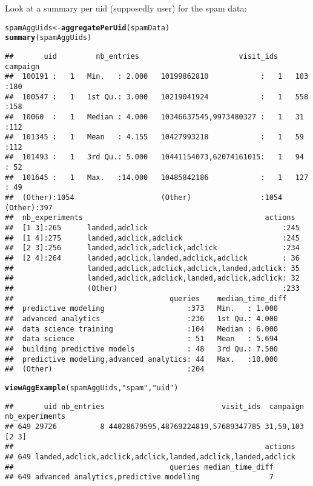 \documentclass{article}\usepackage[]{graphicx}\usepackage[]{color}
\makeatletter
\newcommand{\hlstr}[1]{\textcolor[rgb]{0.192,0.494,0.8}{#1}}%
\newcommand{\hlstd}[1]{\textcolor[rgb]{0.345,0.345,0.345}{#1}}%
\newcommand{\hlkwb}[1]{\textcolor[rgb]{0.69,0.353,0.396}{#1}}%
\newcommand{\hlkwd}[1]{\textcolor[rgb]{0.737,0.353,0.396}{\textbf{#1}}}%
\newenvironment{kframe}{%
 \def\at@end@of@kframe{}%
 \ifinner\ifhmode%
  \def\at@end@of@kframe{\end{minipage}}%
  \begin{minipage}{\columnwidth}%
 \fi\fi%
 \def\FrameCommand##1{\hskip\@totalleftmargin \hskip-\fboxsep
 \colorbox{shadecolor}{##1}\hskip-\fboxsep
     \hskip-\linewidth \hskip-\@totalleftmargin \hskip\columnwidth}%
 \MakeFramed {\advance\hsize-\width
   \@totalleftmargin\z@ \linewidth\hsize
   \@setminipage}}%
 {\par\unskip\endMakeFramed%
 \at@end@of@kframe}
\newenvironment{knitrout}{}{} %
\makeatother
\begin{document}
Look at a summary per uid (supposedly user) for the spam data:
\begin{knitrout}
\color{fgcolor}\begin{kframe}
\begin{alltt}
\hlstd{spamAggUids} \hlkwb{<-} \hlkwd{aggregatePerUid}\hlstd{(spamData)}
\hlkwd{summary}\hlstd{(spamAggUids)}
\end{alltt}
\begin{verbatim}
##       uid         nb_entries                       visit_ids       campaign  
##  100191 :   1   Min.   : 2.000   10199862810            :   1   103    :180  
##  100547 :   1   1st Qu.: 3.000   10219041924            :   1   558    :158  
##  10060  :   1   Median : 4.000   10346637545,9973480327 :   1   31     :112  
##  101345 :   1   Mean   : 4.155   10427993218            :   1   59     :112  
##  101493 :   1   3rd Qu.: 5.000   10441154073,62074161015:   1   94     : 52  
##  101645 :   1   Max.   :14.000   10485842186            :   1   127    : 49  
##  (Other):1054                    (Other)                :1054   (Other):397  
##  nb_experiments                                          actions   
##  [1 3]:265      landed,adclick                               :245  
##  [1 4]:275      landed,adclick,adclick                       :245  
##  [2 3]:256      landed,adclick,adclick,adclick               :234  
##  [2 4]:264      landed,adclick,landed,adclick,adclick        : 36  
##                 landed,adclick,adclick,adclick,landed,adclick: 35  
##                 landed,adclick,adclick,landed,adclick,adclick: 32  
##                 (Other)                                      :233  
##                                    queries    median_time_diff
##  predictive modeling                   :373   Min.   : 1.000  
##  advanced analytics                    :236   1st Qu.: 4.000  
##  data science training                 :104   Median : 6.000  
##  data science                          : 51   Mean   : 5.694  
##  building predictive models            : 48   3rd Qu.: 7.500  
##  predictive modeling,advanced analytics: 44   Max.   :10.000  
##  (Other)                               :204
\end{verbatim}
\begin{alltt}
\hlkwd{viewAggExample}\hlstd{(spamAggUids,} \hlstr{"spam"}\hlstd{,} \hlstr{"uid"}\hlstd{)}
\end{alltt}
\begin{verbatim}
##       uid nb_entries                           visit_ids  campaign nb_experiments
## 649 29726          8 44028679595,48769224819,57689347785 31,59,103          [2 3]
##                                                          actions
## 649 landed,adclick,adclick,adclick,landed,adclick,landed,adclick
##                                    queries median_time_diff
## 649 advanced analytics,predictive modeling                7
\end{verbatim}
\end{kframe}
\end{knitrout}
\end{document}
